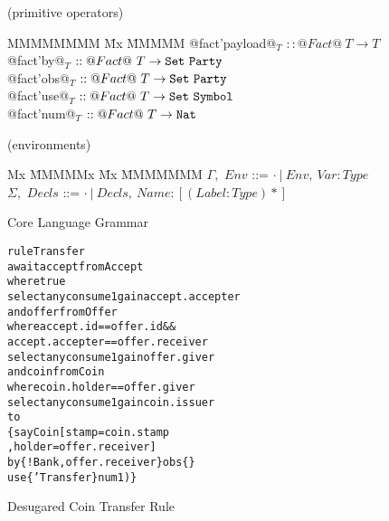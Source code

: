 \begin{figure}
\medskip
\begin{flushleft}
(primitive operators)
\end{flushleft}
\begin{tabbing}
MMMMMMMM \= Mx \= MMMMM \kill
   @fact'payload@$_T$ \> $:: @Fact@~ T \to T$
\\ @fact'by@$_T$      \> $:: @Fact@~ T \to \texttt{Set}~ \texttt{Party}$
\\ @fact'obs@$_T$     \> $:: @Fact@~ T \to \texttt{Set}~ \texttt{Party}$
\\ @fact'use@$_T$     \> $:: @Fact@~ T \to \texttt{Set}~ \texttt{Symbol}$
\\ @fact'num@$_T$     \> $:: @Fact@~ T \to \texttt{Nat}$
\end{tabbing}


\medskip
\begin{flushleft}
(environments)
\begin{tabbing}
Mx              \= MMMMMx       \= Mx \= MMMMMMM \kill
   $\Gamma,$       \> $Env$     \> ::= \> $\cdot ~|~ Env,~ Var : Type$
\\ $\Sigma,$       \> $Decls$   \> ::= \> $\cdot ~|~ Decls,~ Name : [(Label : Type)*]$
\end{tabbing}
\end{flushleft}

\caption{Core Language Grammar}
\label{f:Grammar}
\end{figure}



\begin{figure}
\begin{small}
\begin{alltt}
rule  Transfer
await accept from Accept
       where true
       select any  consume 1  gain accept.accepter
 and  offer  from Offer
       where accept.id       == offer.id  &&
             accept.accepter == offer.receiver
       select any  consume 1  gain offer.giver
 and  coin   from Coin
       where coin.holder == offer.giver
       select any  consume 1  gain coin.issuer
to
    \{ say Coin [ stamp  = coin.stamp
               , holder = offer.receiver]
       by  \{ !Bank, offer.receiver \}  obs \{ \}
       use \{ 'Transfer \}              num 1) \}
\end{alltt}
\end{small}

\caption{Desugared Coin Transfer Rule}
\label{f:CoinTransferDesugared}
\end{figure}



